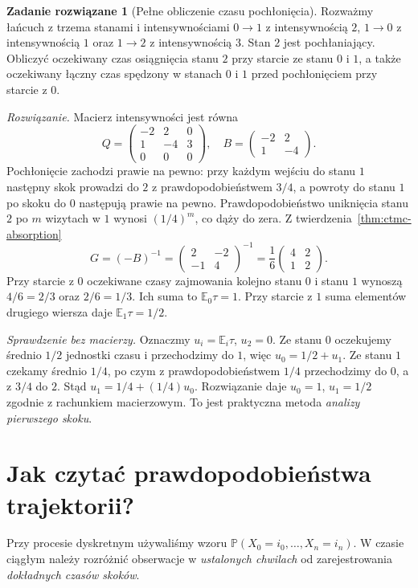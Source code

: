 \documentclass[11pt,a4paper,oneside]{report}
\numberwithin{equation}{chapter}
\theoremstyle{plain}
\theoremstyle{definition}
\newtheorem{zadanie}{Zadanie rozwiązane}[chapter]
\theoremstyle{remark}
\newcommand{\Prob}{\mathbb{P}}
\newcommand{\E}{\mathbb{E}}
\begin{document}
\begin{zadanie}[Pełne obliczenie czasu pochłonięcia]
Rozważmy łańcuch z trzema stanami i intensywnościami
$0\to1$ z intensywnością $2$, $1\to0$ z intensywnością $1$
oraz $1\to2$ z intensywnością $3$.
Stan $2$ jest pochłaniający. Obliczyć oczekiwany czas
osiągnięcia stanu $2$ przy starcie ze stanu $0$ i $1$,
a także oczekiwany łączny czas spędzony w stanach $0$ i $1$
przed pochłonięciem przy starcie z $0$.

\emph{Rozwiązanie.} Macierz intensywności jest równa
\[
Q=\begin{pmatrix}-2&2&0\\1&-4&3\\0&0&0\end{pmatrix},
\quad
B=\begin{pmatrix}-2&2\\1&-4\end{pmatrix}.
\]
Pochłonięcie zachodzi prawie na pewno: przy każdym wejściu
do stanu $1$ następny skok prowadzi do $2$ z
prawdopodobieństwem $3/4$, a powroty do stanu $1$ po skoku
do $0$ następują prawie na pewno. Prawdopodobieństwo
uniknięcia stanu $2$ po $m$ wizytach w $1$ wynosi $(1/4)^m$,
co dąży do zera.
Z twierdzenia~\ref{thm:ctmc-absorption}
\[
G=(-B)^{-1}
=\begin{pmatrix}2&-2\\-1&4\end{pmatrix}^{-1}
=\frac16\begin{pmatrix}4&2\\1&2\end{pmatrix}.
\]
Przy starcie z $0$ oczekiwane czasy zajmowania kolejno
stanu $0$ i stanu $1$ wynoszą $4/6=2/3$ oraz $2/6=1/3$.
Ich suma to $\E_0\tau=1$. Przy starcie z $1$ suma
elementów drugiego wiersza daje $\E_1\tau=1/2$.

\emph{Sprawdzenie bez macierzy.} Oznaczmy
$u_i=\E_i\tau$, $u_2=0$.
Ze stanu $0$ oczekujemy średnio $1/2$ jednostki czasu
i przechodzimy do $1$, więc $u_0=1/2+u_1$.
Ze stanu $1$ czekamy średnio $1/4$, po czym z
prawdopodobieństwem $1/4$ przechodzimy do $0$,
a z $3/4$ do $2$. Stąd
$u_1=1/4+(1/4)u_0$. Rozwiązanie daje
$u_0=1$, $u_1=1/2$ zgodnie z rachunkiem macierzowym.
To jest praktyczna metoda \emph{analizy pierwszego skoku}.
\end{zadanie}

\section{Jak czytać prawdopodobieństwa trajektorii?}
Przy procesie dyskretnym używaliśmy wzoru
$\Prob(X_0=i_0,\ldots,X_n=i_n)$.
W czasie ciągłym należy rozróżnić obserwacje
w \emph{ustalonych chwilach} od zarejestrowania
\emph{dokładnych czasów skoków}.
\end{document}
